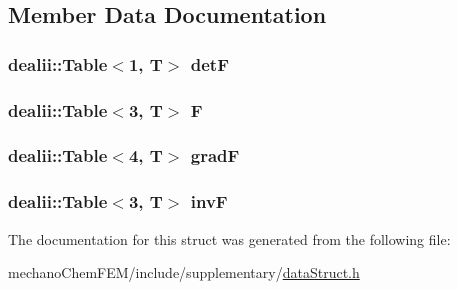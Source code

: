 \subsection{Member Data Documentation}
\subsubsection[{det\-F}]{\setlength{\rightskip}{0pt plus 5cm}dealii\-::\-Table$<$1, T$>$ det\-F}\label{structdeformation_mapwith_grad_aa1ff2dc8fb6f4f6e9125ca026505a977}
\subsubsection[{F}]{\setlength{\rightskip}{0pt plus 5cm}dealii\-::\-Table$<$3, T$>$ F}\label{structdeformation_mapwith_grad_a7934bed7ba72b5e4a3af1fd8a4e14198}
\subsubsection[{grad\-F}]{\setlength{\rightskip}{0pt plus 5cm}dealii\-::\-Table$<$4, T$>$ grad\-F}\label{structdeformation_mapwith_grad_a5bd7f05522c7d581d02e4de55682f5f2}
\subsubsection[{inv\-F}]{\setlength{\rightskip}{0pt plus 5cm}dealii\-::\-Table$<$3, T$>$ inv\-F}\label{structdeformation_mapwith_grad_ae40deb9e4616ec6d0b77519e56646ce0}


The documentation for this struct was generated from the following file\-:\begin{DoxyCompactItemize}
\item 
mechano\-Chem\-F\-E\-M/include/supplementary/\hyperlink{data_struct_8h}{data\-Struct.\-h}\end{DoxyCompactItemize}
